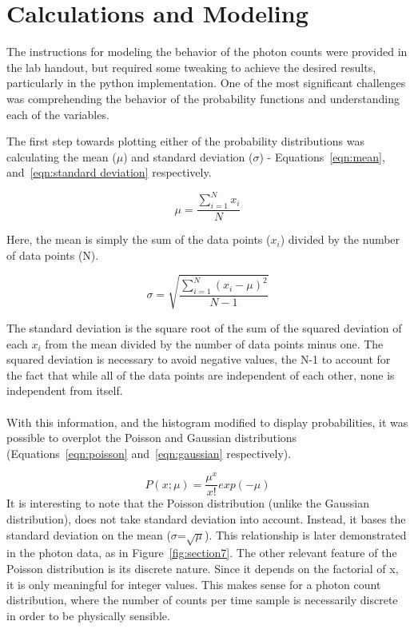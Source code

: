 \documentclass[a4paper,12pt]{article}
\begin{document}
\section{Calculations and Modeling}
\label{sec:calculations}

The instructions for modeling the behavior of the photon counts were provided in the lab handout, but required some tweaking to achieve the desired results, particularly in the python implementation. One of the most significant challenges was comprehending the behavior of the probability functions and understanding each of the variables.

The first step towards plotting either of the probability distributions was calculating the mean ($\mu$) and standard deviation ($\sigma$) - Equations~\ref{eqn:mean}, and~\ref{eqn:standard deviation} respectively. 


\begin{equation}
\label{eqn:mean}
\mu = \frac{\sum_{i=1}^{N}{x_i}}{N}
\end{equation}

Here, the mean is simply the sum of the data points ($x_i$) divided by the number of data points (N).

\begin{equation}
\label{eqn:standard deviation}
\sigma = \sqrt{\frac{\sum_{i=1}^{N}(x_i-\mu)^2}{N-1}}
\end{equation}

The standard deviation is the square root of the sum of the squared deviation of each $x_i$ from the mean divided by the number of data points minus one. The squared deviation is necessary to avoid negative values, the N-1 to account for the fact that while all of the data points are independent of each other, none is independent from itself.
\\
\\
With this information, and the histogram modified to display probabilities, it was possible to overplot the Poisson and Gaussian distributions (Equations~\ref{eqn:poisson} and~\ref{eqn:gaussian} respectively).

\begin{equation}
\label{eqn:poisson}
P(x;\mu) = \frac{\mu^x}{x!}exp(-\mu)
\end{equation}
It is interesting to note that the Poisson distribution (unlike the Gaussian distribution), does not take standard deviation into account. Instead, it bases the standard deviation on the mean ($\sigma$=$\sqrt{\mu}$). This relationship is later demonstrated in the photon data, as in Figure~\ref{fig:section7}. The other relevant feature of the Poisson distribution is its discrete nature. Since it depends on the factorial of x, it is only meaningful for integer values. This makes sense for a photon count distribution, where the number of counts per time sample is necessarily discrete in order to be physically sensible.
\end{document}
